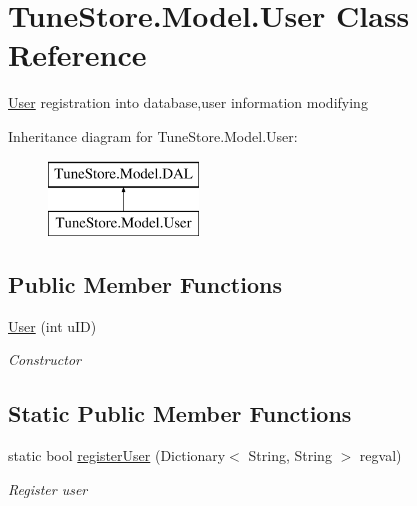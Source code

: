 \hypertarget{class_tune_store_1_1_model_1_1_user}{\section{Tune\+Store.\+Model.\+User Class Reference}
\label{class_tune_store_1_1_model_1_1_user}
}


\hyperlink{class_tune_store_1_1_model_1_1_user}{User} registration into database,user information modifying  


Inheritance diagram for Tune\+Store.\+Model.\+User\+:\begin{figure}[H]
\begin{center}
\leavevmode
\includegraphics[height=2.000000cm]{class_tune_store_1_1_model_1_1_user}
\end{center}
\end{figure}
\subsection*{Public Member Functions}
\begin{DoxyCompactItemize}
\item 
\hyperlink{class_tune_store_1_1_model_1_1_user_a1fe1df691a5d73e5cd002f95493507c6}{User} (int u\+I\+D)
\begin{DoxyCompactList}\small\item\em Constructor \end{DoxyCompactList}\end{DoxyCompactItemize}
\subsection*{Static Public Member Functions}
\begin{DoxyCompactItemize}
\item 
static bool \hyperlink{class_tune_store_1_1_model_1_1_user_a20b4b1fd62760b59ac9a12f6b023e048}{register\+User} (Dictionary$<$ String, String $>$ regval)
\begin{DoxyCompactList}\small\item\em Register user \end{DoxyCompactList}\end{DoxyCompactItemize}
